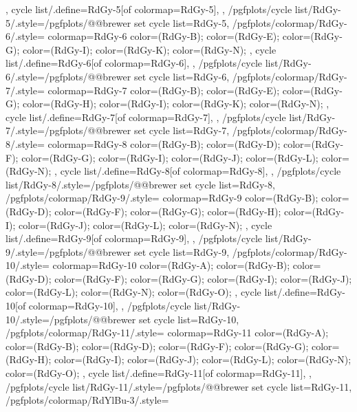 {{{    },
    cycle list/.define={RdGy-5}{[of colormap=RdGy-5]},
  },
  /pgfplots/cycle list/RdGy-5/.style={/pgfplots/@@brewer set cycle list={RdGy-5}},
  /pgfplots/colormap/RdGy-6/.style={
    colormap={RdGy-6}{
      color=(RdGy-B);
      color=(RdGy-E);
      color=(RdGy-G);
      color=(RdGy-I);
      color=(RdGy-K);
      color=(RdGy-N);
    },
    cycle list/.define={RdGy-6}{[of colormap=RdGy-6]},
  },
  /pgfplots/cycle list/RdGy-6/.style={/pgfplots/@@brewer set cycle list={RdGy-6}},
  /pgfplots/colormap/RdGy-7/.style={
    colormap={RdGy-7}{
      color=(RdGy-B);
      color=(RdGy-E);
      color=(RdGy-G);
      color=(RdGy-H);
      color=(RdGy-I);
      color=(RdGy-K);
      color=(RdGy-N);
    },
    cycle list/.define={RdGy-7}{[of colormap=RdGy-7]},
  },
  /pgfplots/cycle list/RdGy-7/.style={/pgfplots/@@brewer set cycle list={RdGy-7}},
  /pgfplots/colormap/RdGy-8/.style={
    colormap={RdGy-8}{
      color=(RdGy-B);
      color=(RdGy-D);
      color=(RdGy-F);
      color=(RdGy-G);
      color=(RdGy-I);
      color=(RdGy-J);
      color=(RdGy-L);
      color=(RdGy-N);
    },
    cycle list/.define={RdGy-8}{[of colormap=RdGy-8]},
  },
  /pgfplots/cycle list/RdGy-8/.style={/pgfplots/@@brewer set cycle list={RdGy-8}},
  /pgfplots/colormap/RdGy-9/.style={
    colormap={RdGy-9}{
      color=(RdGy-B);
      color=(RdGy-D);
      color=(RdGy-F);
      color=(RdGy-G);
      color=(RdGy-H);
      color=(RdGy-I);
      color=(RdGy-J);
      color=(RdGy-L);
      color=(RdGy-N);
    },
    cycle list/.define={RdGy-9}{[of colormap=RdGy-9]},
  },
  /pgfplots/cycle list/RdGy-9/.style={/pgfplots/@@brewer set cycle list={RdGy-9}},
  /pgfplots/colormap/RdGy-10/.style={
    colormap={RdGy-10}{
      color=(RdGy-A);
      color=(RdGy-B);
      color=(RdGy-D);
      color=(RdGy-F);
      color=(RdGy-G);
      color=(RdGy-I);
      color=(RdGy-J);
      color=(RdGy-L);
      color=(RdGy-N);
      color=(RdGy-O);
    },
    cycle list/.define={RdGy-10}{[of colormap=RdGy-10]},
  },
  /pgfplots/cycle list/RdGy-10/.style={/pgfplots/@@brewer set cycle list={RdGy-10}},
  /pgfplots/colormap/RdGy-11/.style={
    colormap={RdGy-11}{
      color=(RdGy-A);
      color=(RdGy-B);
      color=(RdGy-D);
      color=(RdGy-F);
      color=(RdGy-G);
      color=(RdGy-H);
      color=(RdGy-I);
      color=(RdGy-J);
      color=(RdGy-L);
      color=(RdGy-N);
      color=(RdGy-O);
    },
    cycle list/.define={RdGy-11}{[of colormap=RdGy-11]},
  },
  /pgfplots/cycle list/RdGy-11/.style={/pgfplots/@@brewer set cycle list={RdGy-11}},
  /pgfplots/colormap/RdYlBu-3/.style={
}}
